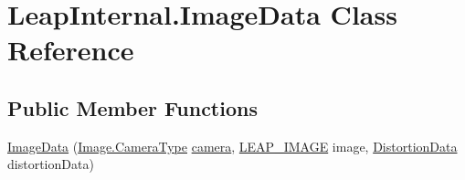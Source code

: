\hypertarget{class_leap_internal_1_1_image_data}{}\section{Leap\+Internal.\+Image\+Data Class Reference}
\label{class_leap_internal_1_1_image_data}
\subsection*{Public Member Functions}
\begin{DoxyCompactItemize}
\item 
\mbox{\hyperlink{class_leap_internal_1_1_image_data_a3df0a6eae342b22f18f7e4c1386488c1}{Image\+Data}} (\mbox{\hyperlink{class_leap_1_1_image_a28310e43e0f2d7f7117e1b45330bdc38}{Image.\+Camera\+Type}} \mbox{\hyperlink{class_leap_internal_1_1_image_data_ae2bcf00690139005099a3698f6c63a9e}{camera}}, \mbox{\hyperlink{struct_leap_internal_1_1_l_e_a_p___i_m_a_g_e}{L\+E\+A\+P\+\_\+\+I\+M\+A\+GE}} image, \mbox{\hyperlink{class_leap_1_1_distortion_data}{Distortion\+Data}} distortion\+Data)
\end{DoxyCompactItemize}
